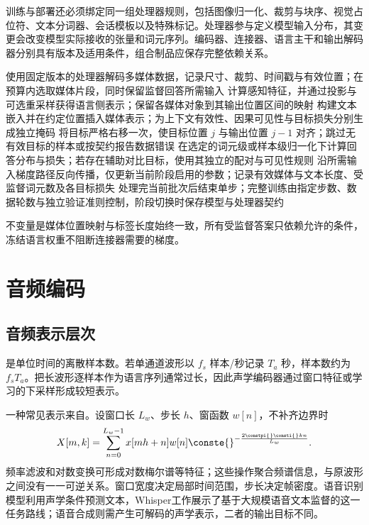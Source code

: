 \documentclass[../textbook.tex]{subfiles}
\begin{document}
训练与部署还必须绑定同一组处理器规则，包括图像归一化、裁剪与块序、视觉占位符、文本分词器、会话模板以及特殊标记。处理器参与定义模型输入分布，其变更会改变模型实际接收的张量和词元序列。编码器、连接器、语言主干和输出解码器分别具有版本及适用条件，组合制品应保存完整依赖关系。

\begin{algorithm}[多模态条件生成的训练步骤]
\begin{myalgorithmic}[1]
 \State 使用固定版本的处理器解码多媒体数据，记录尺寸、裁剪、时间戳与有效位置；在预算内选取媒体片段，同时保留监督回答所需输入
 \State 计算感知特征，并通过投影与可选重采样获得语言侧表示；保留各媒体对象到其输出位置区间的映射
 \State 构建文本嵌入并在约定位置插入媒体表示；为上下文有效性、因果可见性与目标损失分别生成独立掩码
 \State 将目标严格右移一次，使目标位置 $j$ 与输出位置 $j-1$ 对齐；跳过无有效目标的样本或按契约报告数据错误
 \State 在选定的词元级或样本级归一化下计算回答分布与损失；若存在辅助对比目标，使用其独立的配对与可见性规则
 \State 沿所需输入梯度路径反向传播，仅更新当前阶段启用的参数；记录有效媒体与文本长度、受监督词元数及各目标损失
 \State 处理完当前批次后结束单步；完整训练由指定步数、数据轮数与独立验证准则控制，阶段切换时保存模型与处理器契约
\end{myalgorithmic}
不变量是媒体位置映射与标签长度始终一致，所有受监督答案只依赖允许的条件，冻结语言权重不阻断连接器需要的梯度。
\end{algorithm}

\section{音频编码}
\optional
\subsection{音频表示层次}
是单位时间的离散样本数。若单通道波形以 $f_s$ 样本/秒记录 $T_a$ 秒，样本数约为 $f_sT_a$。把长波形逐样本作为语言序列通常过长，因此声学编码器通过窗口特征或学习的下采样形成较短表示。

一种常见表示来自。设窗口长 $L_w$、步长 $h$、窗函数 $w[n]$，不补齐边界时
\begin{equation}
 X[m,k]=\sum_{n=0}^{L_w-1}x[mh+n]w[n]\conste{}^{-\frac{2\constpi{}\consti{} kn}{L_w}}.
\end{equation}
频率滤波和对数变换可形成对数梅尔谱等特征；这些操作聚合频谱信息，与原波形之间没有一一可逆关系。窗口宽度决定局部时间范围，步长决定帧密度。语音识别模型利用声学条件预测文本，Whisper工作展示了基于大规模语音文本监督的这一任务路线\cite{radford2022whisper}；语音合成则需产生可解码的声学表示，二者的输出目标不同。
\end{document}
